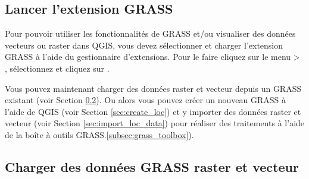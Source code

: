 \subsection{Lancer l'extension GRASS}\label{sec:starting_grass} 


Pour pouvoir utiliser les fonctionnalités de GRASS et/ou visualiser des données vecteurs ou raster dans QGIS, vous devez sélectionner et charger l'extension GRASS à l'aide 
du gestionnaire d'extensions. Pour le faire cliquez sur le menu  > , sélectionnez  et cliquez sur . 


Vous pouvez maintenant charger des données raster et vecteur depuis un  GRASS existant (voir Section \ref{sec:load_grassdata}). Ou alors vous pouvez créer un nouveau  GRASS à l'aide de QGIS (voir Section \ref{sec:create_loc}) et y importer des données raster et vecteur (voir Section \ref{sec:import_loc_data}) pour réaliser des traitements à l'aide de la boîte à outils GRASS.\ref{subsec:grass_toolbox}).


\subsection{Charger des données GRASS raster et vecteur}\label{sec:load_grassdata} 


